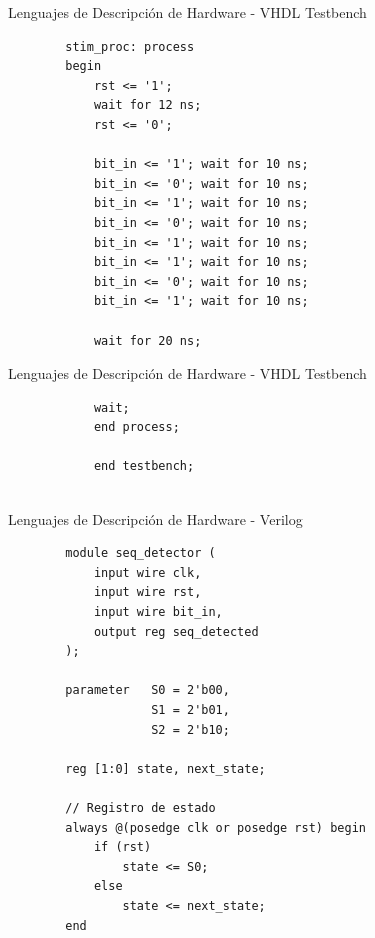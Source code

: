 \documentclass[11pt]{beamer}
\begin{document}
	\begin{frame}[fragile]{Lenguajes de Descripción de Hardware - VHDL Testbench}
	\begin{lstlisting}
		stim_proc: process
		begin
			rst <= '1';
			wait for 12 ns;
			rst <= '0';
			
			bit_in <= '1'; wait for 10 ns;
			bit_in <= '0'; wait for 10 ns;
			bit_in <= '1'; wait for 10 ns;
			bit_in <= '0'; wait for 10 ns;
			bit_in <= '1'; wait for 10 ns;
			bit_in <= '1'; wait for 10 ns;
			bit_in <= '0'; wait for 10 ns;
			bit_in <= '1'; wait for 10 ns;
			
			wait for 20 ns;
	\end{lstlisting}
	\end{frame}

	\begin{frame}[fragile]{Lenguajes de Descripción de Hardware - VHDL Testbench}
	\begin{lstlisting}
			wait;
			end process;
			
			end testbench;
			
	\end{lstlisting}
	\end{frame}



	\begin{frame}[fragile]{Lenguajes de Descripción de Hardware - Verilog}
	\begin{lstlisting}
		module seq_detector (
			input wire clk,
			input wire rst,
			input wire bit_in,
			output reg seq_detected
		);
		
		parameter 	S0 = 2'b00,
					S1 = 2'b01,
					S2 = 2'b10;
		
		reg [1:0] state, next_state;
		
		// Registro de estado
		always @(posedge clk or posedge rst) begin
			if (rst)
				state <= S0;
			else
				state <= next_state;
		end
	\end{lstlisting}
	\end{frame}
\end{document}
